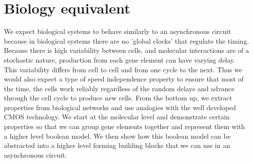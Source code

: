 \documentclass{article}
\begin{document}
\section{Biology equivalent}
We expect biological systems to behave similarly to an asynchronous circuit because in biological systems there are no 'global clocks' that regulate the timing.  Because there is high variability between cells, and molecular interactions are of a stochastic nature, production from each gene element can have varying delay.  This variability differs from cell to cell and from one cycle to the next. Thus we would also expect a type of speed independence property to ensure that most of the time, the cells work reliably regardless of the random delays and advance through the cell cycle to produce new cells.
\newline \newline
From the bottom up, we extract properties from biological networks and use analogies with the well developed CMOS technology.  We start at the molecular level and demonstrate certain properties so that we can group gene elements together and represent them with a higher level boolean model.  We then show how this boolean model can be abstracted into a higher level forming building blocks that we can use in an asynchronous circuit. 
\newline \newline
\end{document}
